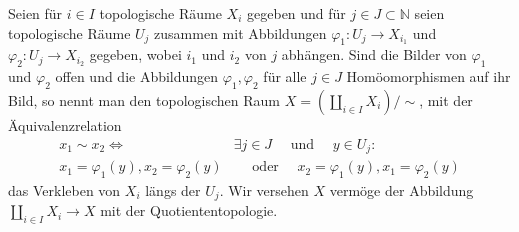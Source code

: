 \documentclass[10pt, letterpaper]{article}
\begin{document}
Seien für $i \in I$ topologische Räume $X_{i}$ gegeben und für $j \in J \subset \mathbb{N}$ seien topologische Räume $U_{j}$ zusammen mit Abbildungen $\varphi_{1}: U_{j} \rightarrow X_{i_{1}}$ und $\varphi_{2}: U_{j} \rightarrow X_{i_{2}}$ gegeben, wobei $i_{1}$ und $i_{2}$ von $j$ abhängen. Sind die Bilder von $\varphi_{1}$ und $\varphi_{2}$ offen und die Abbildungen $\varphi_{1}, \varphi_{2}$ für alle $j \in J$ Homöomorphismen auf ihr Bild, so nennt man den topologischen Raum $X=\left(\coprod_{i \in I} X_{i}\right) / \sim$, mit der Äquivalenzrelation
$$
\begin{aligned}
x_{1} \sim x_{2} \Leftrightarrow & \exists j \in J \quad \text { und } \quad y \in U_{j}: \\
x_{1}=\varphi_{1}(y), x_{2}=\varphi_{2}(y) & \quad \text { oder } \quad x_{2}=\varphi_{1}(y), x_{1}=\varphi_{2}(y)
\end{aligned}
$$
das Verkleben von $X_{i}$ längs der $U_{j}$. Wir versehen $X$ vermöge der Abbildung $\coprod_{i \in I} X_{i} \longrightarrow X$ mit der Quotiententopologie. 
\end{document}
